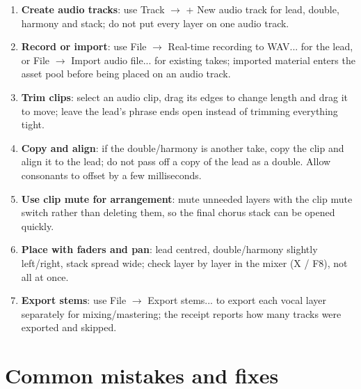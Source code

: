 \begin{enumerate}
\item \textbf{Create audio tracks}: use Track $\rightarrow$ + New audio track for lead, double, harmony and stack; do not put every layer on one audio track.
\item \textbf{Record or import}: use File $\rightarrow$ Real-time recording to WAV... for the lead, or File $\rightarrow$ Import audio file... for existing takes; imported material enters the asset pool before being placed on an audio track.
\item \textbf{Trim clips}: select an audio clip, drag its edges to change length and drag it to move; leave the lead's phrase ends open instead of trimming everything tight.
\item \textbf{Copy and align}: if the double/harmony is another take, copy the clip and align it to the lead; do not pass off a copy of the lead as a double. Allow consonants to offset by a few milliseconds.
\item \textbf{Use clip mute for arrangement}: mute unneeded layers with the clip mute switch rather than deleting them, so the final chorus stack can be opened quickly.
\item \textbf{Place with faders and pan}: lead centred, double/harmony slightly left/right, stack spread wide; check layer by layer in the mixer (X / F8), not all at once.
\item \textbf{Export stems}: use File $\rightarrow$ Export stems... to export each vocal layer separately for mixing/mastering; the receipt reports how many tracks were exported and skipped.
\end{enumerate}


\section{Common mistakes and fixes}
\label{sec:vocal-mistakes}


